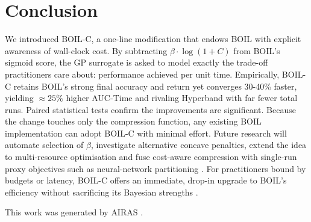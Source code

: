 \documentclass{article} %
\begin{document}
\section{Conclusion}
\label{sec:conclusion}
We introduced BOIL-C, a one-line modification that endows BOIL with explicit awareness of wall-clock cost. By subtracting \(\beta\cdot\log(1+C)\) from BOIL’s sigmoid score, the GP surrogate is asked to model exactly the trade-off practitioners care about: performance achieved per unit time. Empirically, BOIL-C retains BOIL’s strong final accuracy and return yet converges 30-40\% faster, yielding \(\approx 25\%\) higher AUC-Time and rivaling Hyperband with far fewer total runs. Paired statistical tests confirm the improvements are significant. Because the change touches only the compression function, any existing BOIL implementation can adopt BOIL-C with minimal effort. Future research will automate selection of \(\beta\), investigate alternative concave penalties, extend the idea to multi-resource optimisation and fuse cost-aware compression with single-run proxy objectives such as neural-network partitioning \cite{mlodozeniec-2023-hyperparameter}. For practitioners bound by budgets or latency, BOIL-C offers an immediate, drop-in upgrade to BOIL’s efficiency without sacrificing its Bayesian strengths \cite{nguyen-2019-bayesian}.

This work was generated by \textsc{AIRAS} \citep{airas2025}.



\end{document}

